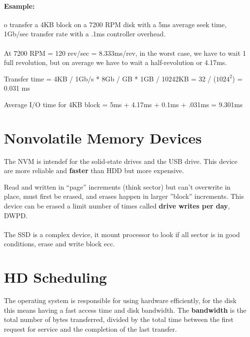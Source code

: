 \paragraph{Esample: }o transfer a 4KB block on a 7200 RPM disk with a 5ms
average seek time, 1Gb/sec transfer rate with a .1ms controller
overhead.

\paragraph{}
At 7200 RPM = 120 rev/sec = 8.333ms/rev, in the worst case, we have to wait 1 full revolution, but on average we have to wait a half-revolution or 4.17ms.


Transfer time = 4KB / 1Gb/s * 8Gb / GB * 1GB / 10242KB = 32 / ($1024^2$) = 0.031 ms

Average I/O time for 4KB block = 5ms + 4.17ms + 0.1ms + .031ms = 9.301ms

\section{Nonvolatile Memory Devices}

The NVM is intendef for the solid-state drives and the USB drive. This device are more reliable and \textbf{faster} than HDD but more expensive.

Read and written in “page” increments (think sector) but can’t
overwrite in place, must first be erased, and erases happen in larger ”block”
increments. This device can be erased a limit number of times called \textbf{drive writes per day}, DWPD.

\paragraph{}
The SSD is a complex device, it mount processor to look if all sector is in good conditions, erase and write block ecc.

\section{HD Scheduling}

The operating system is responsible for using hardware efficiently, for the disk this means having a fast access time and disk
bandwidth. The \textbf{bandwidth} is the total number of bytes transferred, divided by
the total time between the first request for service and the completion
of the last transfer.

\paragraph{}

